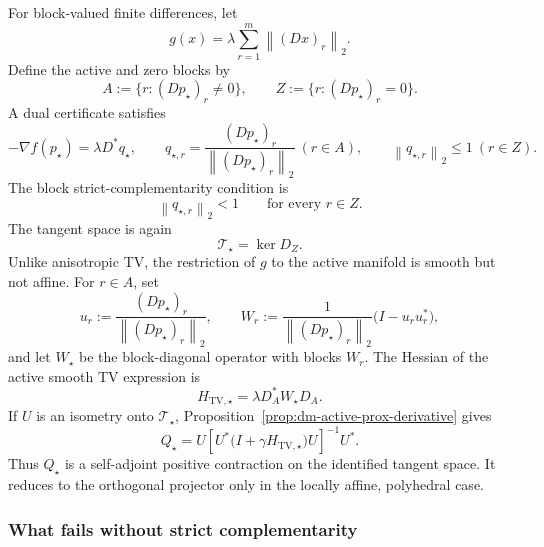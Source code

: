 \documentclass[10pt,leqno]{amsart}
\numberwithin{equation}{section}
\numberwithin{algorithm}{section}
\theoremstyle{remark}
\newcommand{\norm}[1]{\left\lVert #1 \right\rVert}
\newcommand{\grad}{\nabla}
\begin{document}
For block-valued finite differences, let
\begin{equation}
\label{eq:dm-iso-tv-g}
   g(x)=\lambda\sum_{r=1}^m\norm{(Dx)_r}_2.
\end{equation}
Define the active and zero blocks by
\begin{equation}
\label{eq:dm-iso-tv-active-sets}
   A:=\{r:(Dp_\star)_r\ne0\},
   \qquad
   Z:=\{r:(Dp_\star)_r=0\}.
\end{equation}
A dual certificate satisfies
\begin{equation}
\label{eq:dm-iso-tv-certificate}
   -\grad f(p_\star)=\lambda D^*q_\star,
   \qquad
   q_{\star,r}=\frac{(Dp_\star)_r}{\norm{(Dp_\star)_r}_2}
      \ (r\in A),
   \qquad
   \norm{q_{\star,r}}_2\le1
      \ (r\in Z).
\end{equation}
The block strict-complementarity condition is
\begin{equation}
\label{eq:dm-iso-tv-strict-complementarity}
   \norm{q_{\star,r}}_2<1
   \qquad\text{for every }r\in Z.
\end{equation}
The tangent space is again
\begin{equation}
\label{eq:dm-iso-tv-tangent}
   \mathcal T_\star=\ker D_Z.
\end{equation}
Unlike anisotropic TV, the restriction of \(g\) to the active manifold is smooth but not affine.  For \(r\in A\), set
\begin{equation}
\label{eq:dm-iso-tv-unit-blocks}
   u_r:=\frac{(Dp_\star)_r}{\norm{(Dp_\star)_r}_2},
   \qquad
   W_r:=\frac{1}{\norm{(Dp_\star)_r}_2}
          \bigl(I-u_ru_r^*\bigr),
\end{equation}
and let \(W_\star\) be the block-diagonal operator with blocks \(W_r\).  The Hessian of the active smooth TV expression is
\begin{equation}
\label{eq:dm-iso-tv-active-hessian}
   H_{\mathrm{TV},\star}
      =\lambda D_A^*W_\star D_A.
\end{equation}
If \(U\) is an isometry onto \(\mathcal T_\star\), Proposition~\ref{prop:dm-active-prox-derivative} gives
\begin{equation}
\label{eq:dm-iso-tv-Q}
   Q_\star
      =U\left[U^*\bigl(I+\gamma H_{\mathrm{TV},\star}\bigr)U\right]^{-1}U^*.
\end{equation}
Thus \(Q_\star\) is a self-adjoint positive contraction on the identified tangent space.  It reduces to the orthogonal projector only in the locally affine, polyhedral case.

\subsubsection{What fails without strict complementarity}
\end{document}
